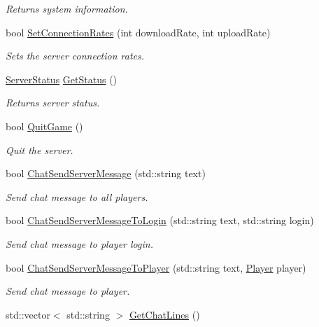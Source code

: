 \begin{DoxyCompactItemize}
\begin{DoxyCompactList}\small\item\em Returns system information. \end{DoxyCompactList}\item 
bool \hyperlink{classMethods_ae87b78f7ee53a98c8bf7494f662c2ad1}{Set\-Connection\-Rates} (int download\-Rate, int upload\-Rate)
\begin{DoxyCompactList}\small\item\em Sets the server connection rates. \end{DoxyCompactList}\item 
\hyperlink{structServerStatus}{Server\-Status} \hyperlink{classMethods_af39e05685756a82b5991a2fc25d5e941}{Get\-Status} ()
\begin{DoxyCompactList}\small\item\em Returns server status. \end{DoxyCompactList}\item 
\hypertarget{classMethods_aee11e205500b7ad449c025c8e3e4b11b}{bool \hyperlink{classMethods_aee11e205500b7ad449c025c8e3e4b11b}{Quit\-Game} ()}\label{classMethods_aee11e205500b7ad449c025c8e3e4b11b}

\begin{DoxyCompactList}\small\item\em Quit the server. \end{DoxyCompactList}\item 
bool \hyperlink{classMethods_a5e639d7a4fa2e2b403dfa5adfbc47ac3}{Chat\-Send\-Server\-Message} (std\-::string text)
\begin{DoxyCompactList}\small\item\em Send chat message to all players. \end{DoxyCompactList}\item 
bool \hyperlink{classMethods_a200065ea89c2694f9d2af3aae686c483}{Chat\-Send\-Server\-Message\-To\-Login} (std\-::string text, std\-::string login)
\begin{DoxyCompactList}\small\item\em Send chat message to player login. \end{DoxyCompactList}\item 
bool \hyperlink{classMethods_a616887260c024c6b7cabcdca9d43fdec}{Chat\-Send\-Server\-Message\-To\-Player} (std\-::string text, \hyperlink{structPlayer}{Player} player)
\begin{DoxyCompactList}\small\item\em Send chat message to player. \end{DoxyCompactList}\item 
\hypertarget{classMethods_a8a5de3ccd3e56cba116c5c1159c91c11}{std\-::vector$<$ std\-::string $>$ \hyperlink{classMethods_a8a5de3ccd3e56cba116c5c1159c91c11}{Get\-Chat\-Lines} ()}\label{classMethods_a8a5de3ccd3e56cba116c5c1159c91c11}


\end{DoxyCompactItemize}
